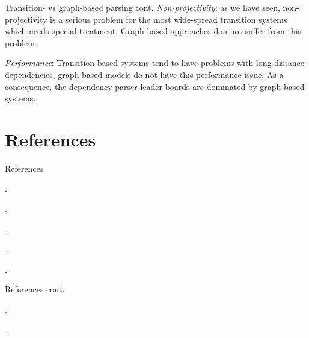 \documentclass[style=upen, size=14pt]{powerdot}
\newcommand{\gold}{\color{arany}}
\theoremstyle{definition}
\begin{document}
\begin{slide}[toc=]{Transition- vs graph-based parsing cont.}
\emph{\gold Non-projectivity}: as we have seen, non-projectivity is a serious problem
for the most wide-spread transition systems which needs special treatment.
Graph-based approaches don not suffer from this problem.\bigskip

\emph{\gold Performance}: Transition-based systems tend to have problems with
long-distance dependencies, graph-based models do not have this performance
issue. As a consequence, the dependency parser leader boards are dominated by
graph-based systems.
\end{slide}
\section{References}

\begin{slide}{References}
  
  \begin{footnotesize}

    .\medskip

    .\medskip

    .\medskip
    
    .\medskip

    .\medskip
    
  \end{footnotesize}
\end{slide}

\begin{slide}[toc=]{References cont.}
  \begin{footnotesize}

    .\medskip

    .\medskip
    
  \end{footnotesize}
\end{slide}
\end{document}
